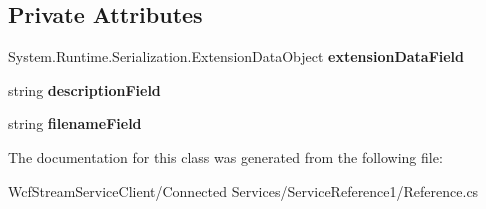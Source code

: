 \subsection*{Private Attributes}
\begin{DoxyCompactItemize}
\item 
\mbox{\label{class_wcf_stream_service_client_1_1_service_reference1_1_1_response_file_info_message_a1fbee71050fbaf521b0c829404bfda65}} 
System.\+Runtime.\+Serialization.\+Extension\+Data\+Object {\bfseries extension\+Data\+Field}
\item 
\mbox{\label{class_wcf_stream_service_client_1_1_service_reference1_1_1_response_file_info_message_a3e677deeae7dee3aa27c746d2a7ddec3}} 
string {\bfseries description\+Field}
\item 
\mbox{\label{class_wcf_stream_service_client_1_1_service_reference1_1_1_response_file_info_message_a408a43077aa3be68d411401dee59d364}} 
string {\bfseries filename\+Field}
\end{DoxyCompactItemize}


The documentation for this class was generated from the following file\+:\begin{DoxyCompactItemize}
\item 
Wcf\+Stream\+Service\+Client/\+Connected Services/\+Service\+Reference1/Reference.\+cs\end{DoxyCompactItemize}
